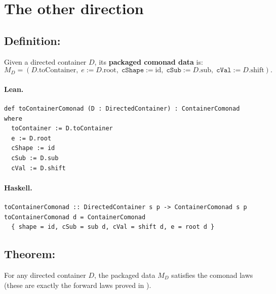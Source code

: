 \documentclass[11pt,a4paper]{article}
\begin{document}
\section{The other direction}

\subsection{Definition: }

\begin{defn}
Given a directed container $D$, its \textbf{packaged comonad data} is:
\[
  M_D = (D.\mathrm{toContainer},\;
         e := D.\mathrm{root},\;
         \mathtt{cShape} := \mathrm{id},\;
         \mathtt{cSub} := D.\mathrm{sub},\;
         \mathtt{cVal} := D.\mathrm{shift}).
\]
\end{defn}

\paragraph{Lean.}
\begin{lstlisting}[style=lean]
def toContainerComonad (D : DirectedContainer) : ContainerComonad where
  toContainer := D.toContainer
  e := D.root
  cShape := id
  cSub := D.sub
  cVal := D.shift
\end{lstlisting}

\paragraph{Haskell.}
\begin{lstlisting}[style=haskell]
toContainerComonad :: DirectedContainer s p -> ContainerComonad s p
toContainerComonad d = ContainerComonad
  { shape = id, cSub = sub d, cVal = shift d, e = root d }
\end{lstlisting}


\subsection{Theorem: }

\begin{thm}
For any directed container $D$, the packaged data $M_D$ satisfies the comonad
laws (these are exactly the forward laws proved in ).
\end{thm}
\end{document}
